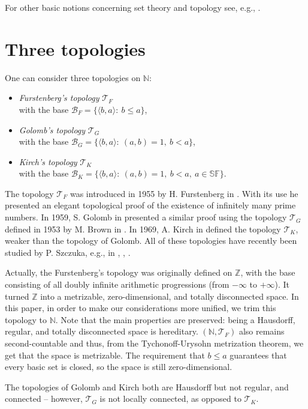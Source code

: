 \documentclass{amsart}
\theoremstyle{definition}
\newcommand{\N}{{\mathbb N}}
\newcommand{\Z}{{\mathbb Z}}
\newcommand{\T}{\mathcal{T}}
\newcommand{\B}{\mathcal{B}}
\newcommand{\SqrFr}{\mathbb{SF}}
\newcommand{\arithseq}[2]{\langle#2, #1\rangle}
\begin{document}
For other basic notions concerning set theory and topology see, e.g., \cite{Kechris}.


\section*{Three topologies}

One can consider three topologies on $\N$:
\begin{itemize}
\item \emph{Furstenberg's topology} $\T_F$ \\
			with the base $\B_F = \{\arithseq{a}{b} :\ b\leq a\}$,
\item \emph{Golomb's topology} $\T_G$ \\
			with the base $\B_G = \{\arithseq{a}{b} :\ (a,b)=1,\ b<a\}$,
\item \emph{Kirch's topology} $\T_K$ \\
			with the base $\B_K = \{\arithseq{a}{b} :\ (a,b)=1,\ b<a,\ a\in\SqrFr\}$.
\end{itemize}

The topology $\T_F$ was introduced in 1955 by H. Furstenberg in \cite{F}. With its use he presented an elegant topological proof of the existence of infinitely many prime numbers. In 1959, S. Golomb in \cite{G} presented a similar proof using the topology $\T_G$ defined in 1953 by M. Brown in \cite{B}. In 1969, A. Kirch in \cite{K} defined the topology $\T_K$, weaker than the topology of Golomb. All of these topologies have recently been studied by P. Szczuka, e.g., in \cite{Szczuka1}, \cite{Szczuka2}, \cite{Szczuka3}.

Actually, the Furstenberg's topology was originally defined on $\Z$, with the base consisting of all doubly infinite arithmetic progressions (from $-\infty$ to $+\infty$). It turned $\Z$ into a metrizable, zero-dimensional, and totally disconnected space. In this paper, in order to make our considerations more unified, we trim this topology to $\N$. Note that the main properties are preserved: being a Hausdorff, regular, and totally disconnected space is hereditary. $(\N,\T_F)$ also remains second-countable and thus, from the Tychonoff-Urysohn metrization theorem, we get that the space is metrizable. The requirement that $b\leq a$ guarantees that every basic set is closed, so the space is still zero-dimensional.

The topologies of Golomb and Kirch both are Hausdorff but not regular, and connected -- however, $\T_G$ is not locally connected, as opposed to $\T_K$.
\end{document}
